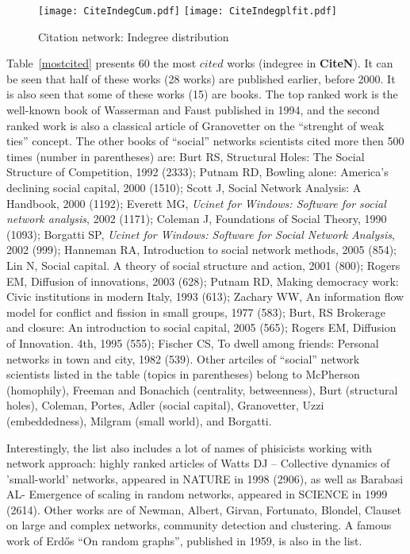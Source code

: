 \documentclass[11pt]{article} %
\begin{document}
\begin{figure}
\centerline{
\texttt{[image: CiteIndegCum.pdf]} \qquad
\texttt{[image: CiteIndegplfit.pdf]} }
\caption{Citation network: Indegree distribution}\label{cindeg}
\end{figure}
\medskip   

Table~\ref{mostcited} presents 60 the most $cited$ works (indegree in \textbf{CiteN}). It can be seen that half of these works (28 works) are published earlier, before 2000. It is also seen that some of these works (15) are books. The top ranked work is the well-known book of Wasserman and Faust published in 1994, and the second ranked work is also a classical article of Granovetter on the ``strenght of weak ties'' concept. The other books of  ``social'' networks scientists cited more then 500 times (number in parentheses) are:  Burt RS, Structural Holes: The Social Structure of Competition, 1992 (2333); Putnam RD, Bowling alone: America’s declining social capital, 2000 (1510); Scott J, Social Network Analysis: A Handbook, 2000 (1192); Everett MG, \textit{Ucinet for Windows: Software for social network analysis}, 2002 (1171); Coleman J, Foundations of Social Theory, 1990 (1093); Borgatti SP,  \textit{Ucinet for Windows: Software for Social Network Analysis}, 2002 (999); Hanneman RA, Introduction to social network methods, 2005 (854); Lin N, Social capital. A theory of social structure and action, 2001 (800); Rogers EM, Diffusion of innovations, 2003 (628); Putnam RD, Making democracy work: Civic institutions in modern Italy, 1993 (613); Zachary WW, An information flow model for conflict and fission in small groups, 1977 (583); Burt, RS	Brokerage and closure: An introduction to social capital, 2005 (565);  Rogers EM, Diffusion of Innovation. 4th, 1995 (555);  Fischer CS, To dwell among friends: Personal networks in town and city, 1982 (539). Other artciles of ``social'' network scientists listed in the table (topics in parentheses) belong to McPherson (homophily), Freeman and Bonachich (centrality, betweenness), Burt (structural holes), Coleman, Portes, Adler (social capital), Granovetter, Uzzi (embeddedness), Milgram (small world), and Borgatti. \medskip 

Interestingly, the list also includes a lot of names of phisicists working with network approach: highly ranked articles of Watts DJ -- Collective dynamics of 'small-world' networks, appeared in NATURE in 1998 (2906), as well as Barabasi AL-  Emergence of scaling in random networks, appeared in SCIENCE	in 1999 (2614). Other works are of Newman, Albert, Girvan, Fortunato, Blondel, Clauset on large and complex networks, community detection and clustering. A famous work of Erd\H{o}s ``On random graphs'', published in 1959, is also in the list. \medskip 
\end{document}
